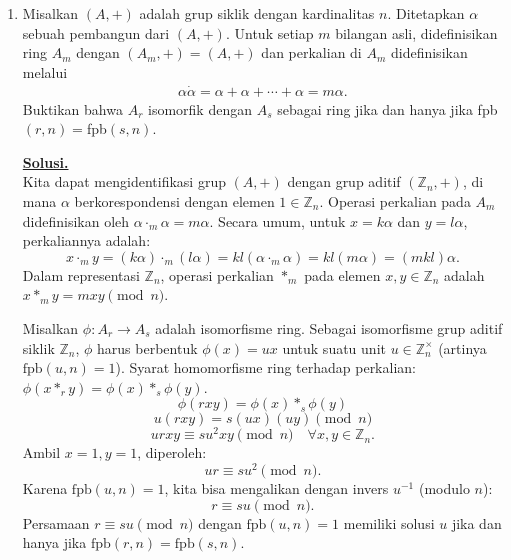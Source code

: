 \documentclass[12pt,twoside]{article}
\newenvironment{solution}
{
	\par\noindent\textbf{\underline{Solusi.}}\\
}
{
	\par
}
\begin{document}
\begin{enumerate}
\begin{solution}
          (a) Ambil modulus kedua ruas:
          \[ |z^{2021}| = |\bar{z}^2| = |\bar{z}|^2 = |z|^2. \]
          \[ |z|^{2021} - |z|^2 = 0 \implies |z|^2 (|z|^{2019} - 1) = 0. \]
          Solusinya adalah $|z|=0$ atau $|z|=1$.
          Jika $|z|=0$, maka $z=0 \implies a=b=0$.
          Jika $|z|=1$, maka $|z|^2=a^2+b^2=1$.
          Terbukti.

          (b)
          Kasus 1: $z=0$. Pasangan $(0,0)$. (1 solusi)
          Kasus 2: $|z|=1$.
          Jika $|z|=1$, maka $z \bar{z} = 1$, sehingga $\bar{z} = \frac{1}{z}$.
          Substitusi ke persamaan awal:
          \[ z^{2021} = \left(\frac{1}{z}\right)^2 = z^{-2}. \]
          \[ z^{2023} = 1. \]
          Solusi dari persamaan ini adalah akar-akar ke-2023 dari satuan. Terdapat 2023 solusi berbeda yang semuanya memiliki modulus 1 (konsisten dengan asumsi $|z|=1$).
          Jadi ada 2023 solusi pada kasus ini.

          Total banyak pasangan milenial adalah $1 + 2023 = 2024$.
        \end{solution}
  \item Misalkan $(A,+)$ adalah grup siklik dengan kardinalitas $n$. Ditetapkan $\alpha$ sebuah pembangun dari $(A,+)$. Untuk setiap $m$ bilangan asli, didefinisikan ring $A_m$ dengan $(A_m,+)=(A,+)$ dan perkalian di $A_m$ didefinisikan melalui
        \begin{align*}
          \alpha\dot \alpha = \alpha+\alpha+\cdots +\alpha =m\alpha.
        \end{align*}
        Buktikan bahwa $A_r$ isomorfik dengan $A_s$ sebagai ring jika dan hanya jika fpb$(r,n)=$fpb$(s,n)$.
        \begin{solution}
          Kita dapat mengidentifikasi grup $(A, +)$ dengan grup aditif $(\mathbb{Z}_n, +)$, di mana $\alpha$ berkorespondensi dengan elemen $1 \in \mathbb{Z}_n$.
          Operasi perkalian pada $A_m$ didefinisikan oleh $\alpha \cdot_m \alpha = m \alpha$.
          Secara umum, untuk $x = k\alpha$ dan $y = l\alpha$, perkaliannya adalah:
          \[ x \cdot_m y = (k\alpha) \cdot_m (l\alpha) = kl (\alpha \cdot_m \alpha) = kl(m\alpha) = (mkl)\alpha. \]
          Dalam representasi $\mathbb{Z}_n$, operasi perkalian $*_m$ pada elemen $x, y \in \mathbb{Z}_n$ adalah $x *_m y = mxy \pmod n$.

          Misalkan $\phi: A_r \to A_s$ adalah isomorfisme ring.
          Sebagai isomorfisme grup aditif siklik $\mathbb{Z}_n$, $\phi$ harus berbentuk $\phi(x) = ux$ untuk suatu unit $u \in \mathbb{Z}_n^\times$ (artinya $\text{fpb}(u, n) = 1$).
          Syarat homomorfisme ring terhadap perkalian: $\phi(x *_r y) = \phi(x) *_s \phi(y)$.
          \[ \phi(rxy) = \phi(x) *_s \phi(y) \]
          \[ u(rxy) = s(ux)(uy) \pmod n \]
          \[ urxy \equiv su^2xy \pmod n \quad \forall x, y \in \mathbb{Z}_n. \]
          Ambil $x=1, y=1$, diperoleh:
          \[ ur \equiv su^2 \pmod n. \]
          Karena $\text{fpb}(u, n)=1$, kita bisa mengalikan dengan invers $u^{-1}$ (modulo $n$):
          \[ r \equiv su \pmod n. \]
          Persamaan $r \equiv su \pmod n$ dengan $\text{fpb}(u,n)=1$ memiliki solusi $u$ jika dan hanya jika $\text{fpb}(r, n) = \text{fpb}(s, n)$.


\end{solution}
\end{enumerate}
\end{document}
